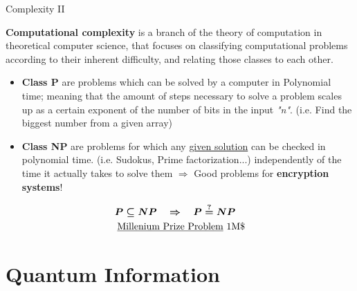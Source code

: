 \documentclass[9pt, handout, aspectratio=169]{beamer}		%
\begin{document}
	\begin{frame}{Complexity II}
	
		\textbf{Computational complexity} is a branch of the theory of computation in theoretical computer science, that focuses on classifying computational problems according to their inherent difficulty, and relating those classes to each other. \pause 
		
		\begin{itemize}
			\item \textbf{Class P} are problems which can be solved by a computer in Polynomial time; meaning that the amount of steps necessary to solve a problem scales up as a certain exponent of the number of bits in the input \emph{"n"}. (i.e. Find the biggest number from a given array) \pause
			\item \textbf{Class NP} are problems for which any \underline{given solution} can be checked in polynomial time. (i.e. Sudokus, Prime factorization...) independently of the time it actually takes to solve them $\Rightarrow$ Good problems for \textbf{encryption systems}!
		\end{itemize}
		
		\pause
		
		\vspace{-8pt}
		\begin{align*}
			\boldsymbol{P \subseteq NP \quad \Rightarrow \quad P \overset{?}{=} NP \quad } \\
			\text{\underline{Millenium Prize Problem} 1M\$}
		\end{align*}
		\vspace{-20pt}
	
	\end{frame}
	
	
\section{Quantum Information}
	
\end{document}
